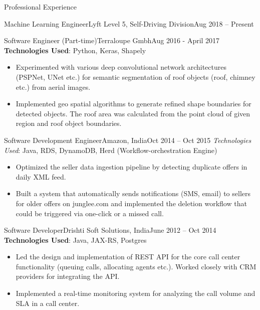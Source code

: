 \documentclass[]{mcdowellcv}
\begin{document}
\begin{cvsection}{Professional Experience}
\begin{cvsubsection}{Machine Learning Engineer}{Lyft Level 5, Self-Driving Division}{Aug 2018 -- Present}
		\end{cvsubsection}
		
		
		\begin{cvsubsection}{Software Engineer (Part-time)}{Terraloupe Gmbh}{Aug 2016 - April 2017}
			\textbf{Technologies Used}: Python, Keras, Shapely
			\begin{itemize}
				\item Experimented with various deep convolutional network architectures (PSPNet, UNet etc.) for semantic segmentation of roof objects (roof, chimney etc.) from aerial images.
				\item Implemented geo spatial algorithms to generate refined shape boundaries for detected objects. The roof area was calculated from the point cloud of given region and roof object boundaries.
			\end{itemize}
		\end{cvsubsection}
		
		
		\begin{cvsubsection}{Software Development Engineer}{Amazon, India}{Oct 2014 -- Oct 2015}  
			\textit{Technologies Used}: Java, RDS, DynamoDB, Herd (Workflow-orchestration Engine)
			\begin{itemize}
				\item Optimized the seller data ingestion pipeline by detecting duplicate offers in daily XML feed.
				\item Built a system that automatically sends notifications (SMS, email) to sellers for older offers on junglee.com and implemented the deletion
				workflow that could be triggered via one-click or a missed call.
			\end{itemize}
		\end{cvsubsection}
		
		\begin{cvsubsection}{Software Developer}{Drishti Soft Solutions, India}{June 2012 -- Oct 2014}
			\textbf{Technologies Used}: Java, JAX-RS, Postgres
			\begin{itemize} 
				\item Led the design and implementation of REST API for the core call center functionality (queuing calls, allocating agents etc.). Worked closely with CRM providers for integrating the API.  
				\item Implemented a real-time monitoring system for analyzing the call volume and SLA in a call center. 
			\end{itemize}
		\end{cvsubsection}
	\end{cvsection}
	
\end{document}

